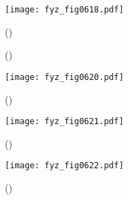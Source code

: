     \begin{figure}[ht!] %
      \centering
      \texttt{[image: fyz\_fig0618.pdf]}
      \caption{
               (\cite[s.~707]{Feynman02})}
      \label{fyz:fig0618}
    \end{figure}

    \begin{figure}[ht!]
      \centering
      \label{fyz:fig0619}
      \caption{
               (\cite[s.~748]{Feynman02})}
    \end{figure}

    \begin{figure}[ht!] %
      \centering
      \texttt{[image: fyz\_fig0620.pdf]}
      \caption{
               (\cite[s.~707]{Feynman02})}
      \label{fyz:fig0620}
    \end{figure}

    \begin{figure}[ht!] %
      \centering
      \texttt{[image: fyz\_fig0621.pdf]}
      \caption{
               (\cite[s.~707]{Feynman02})}
      \label{fyz:fig0621}
    \end{figure}

    \begin{figure}[ht!] %
      \centering
      \texttt{[image: fyz\_fig0622.pdf]}
      \caption{
               (\cite[s.~707]{Feynman02})}
      \label{fyz:fig0622}
    \end{figure}

